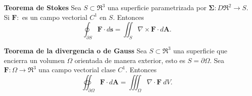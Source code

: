 \begin{theorem}
\textbf{Teorema de Stokes} Sea $S\subset\Re^3$ una superficie parametrizada por $\mathbf{\Sigma}:D\Re^2\to S$. Si $\mathbf{F}:$ es un campo vectorial $C^1$ en $S$. Entonces
\[
    \oint_{\partial S}\mathbf{F}\cdot d\mathbf{s}=\iint_S\nabla\times\mathbf{F}\cdot d\mathbf{A}.
\]
\end{theorem}

\begin{theorem}
\textbf{Teorema de la divergencia o de Gauss} Sea $S\subset\Re^3$ una superficie que encierra un volumen $\Omega$ orientada de manera exterior, esto es $S=\partial \Omega$. Sea $\mathbf{F}:\Omega\to\Re^3$ una campo vectorial clase $C^1$. Entonces
\[
    \oiint_{\partial \Omega}\mathbf{F}\cdot d\mathbf{A}=\iiint_{\Omega}\nabla\cdot\mathbf{F}\:dV.
\]
\end{theorem}